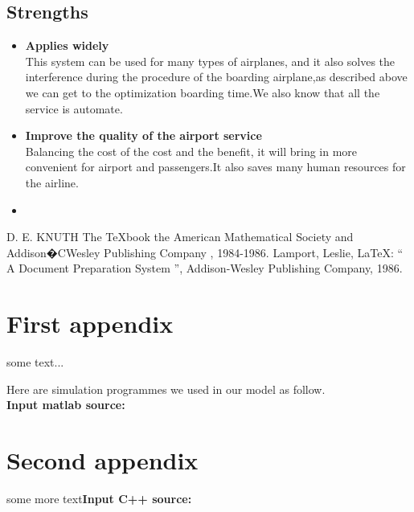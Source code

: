 \subsection{Strengths}
\begin{itemize}
\item \textbf{Applies widely}\\
This  system can be used for many types of airplanes, and it also
solves the interference during  the procedure of the boarding
airplane,as described above we can get to the  optimization
boarding time.We also know that all the service is automate.
\item \textbf{Improve the quality of the airport service}\\
Balancing the cost of the cost and the benefit, it will bring in
more convenient  for airport and passengers.It also saves many
human resources for the airline. \item \textbf{}
\end{itemize}




\begin{thebibliography}{99}
 D. E. KNUTH   The \TeX{}book  the American
Mathematical Society and Addison�CWesley
Publishing Company , 1984-1986.
Lamport, Leslie,  \LaTeX{}: `` A Document Preparation System '',
Addison-Wesley Publishing Company, 1986.
\end{thebibliography}

    \begin{appendices}

      \section{First appendix}

    some text...


Here are simulation programmes we used in our model as follow.\\


\textbf{\textcolor[rgb]{0.98,0.00,0.00}{Input matlab source:}}



      \section{Second appendix}

    some more text\textcolor[rgb]{0.98,0.00,0.00}{\textbf{Input C++ source:}}


    \end{appendices}
